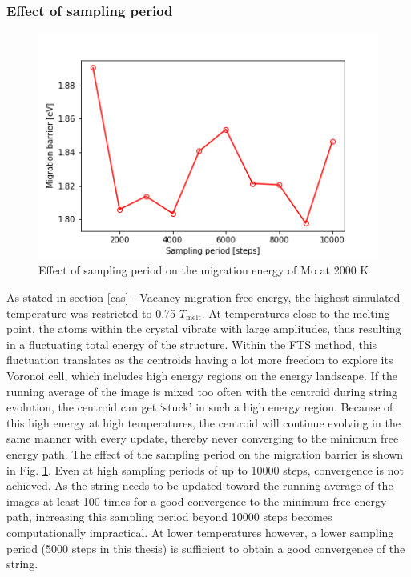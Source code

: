 \documentclass{article}
\begin{document}
\subsubsection{Effect of sampling period}\label{sample}

\begin{figure}[!htp]
\centering
\includegraphics[scale=0.65]{sample_bcc}
\caption{Effect of sampling period on the migration energy of Mo at 2000 K}
\label{fig:22}
\end{figure}

As stated in section \ref{cas} - Vacancy migration free energy, the highest simulated temperature was restricted to 0.75 $T_{\mathrm{melt}}$. At temperatures close to the melting point, the atoms within the crystal vibrate with large amplitudes, thus resulting in a fluctuating total energy of the structure. Within the FTS method, this fluctuation translates as the centroids having a lot more freedom to explore its Voronoi cell, which includes high energy regions on the energy landscape. If the running average of the image is mixed too often with the centroid during string evolution, the centroid can get \enquote*{stuck} in such a high energy region. Because of this high energy at high temperatures, the centroid will continue evolving in the same manner with every update, thereby never converging to the minimum free energy path. The effect of the sampling period on the migration barrier is shown in Fig. \ref{fig:22}. Even at high sampling periods of up to 10000 steps, convergence is not achieved. As the string needs to be updated toward the running average of the images at least 100 times for a good convergence to the minimum free energy path, increasing this sampling period beyond 10000 steps becomes computationally impractical. At lower temperatures however, a lower sampling period (5000 steps in this thesis) is sufficient to obtain a good convergence of the string. 
\end{document}
